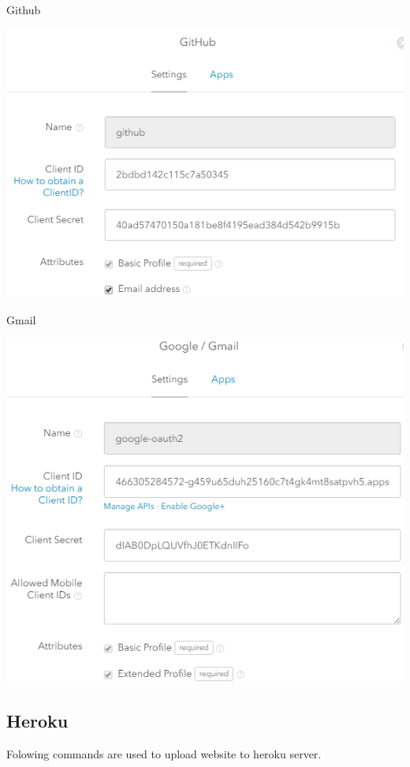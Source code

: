 \begin{itemize}
\pagebreak
Github
\begin{center}    
	\includegraphics{img/SocialGithub.png}
\end{center}
\pagebreak
Gmail
\begin{center}    
	\includegraphics{img/SocialGmail.png}
\end{center}
\pagebreak
\subsection{Heroku}
Folowing commands are used to upload website to heroku server.
\begin{verbatim}


\end{verbatim}
\end{itemize}
